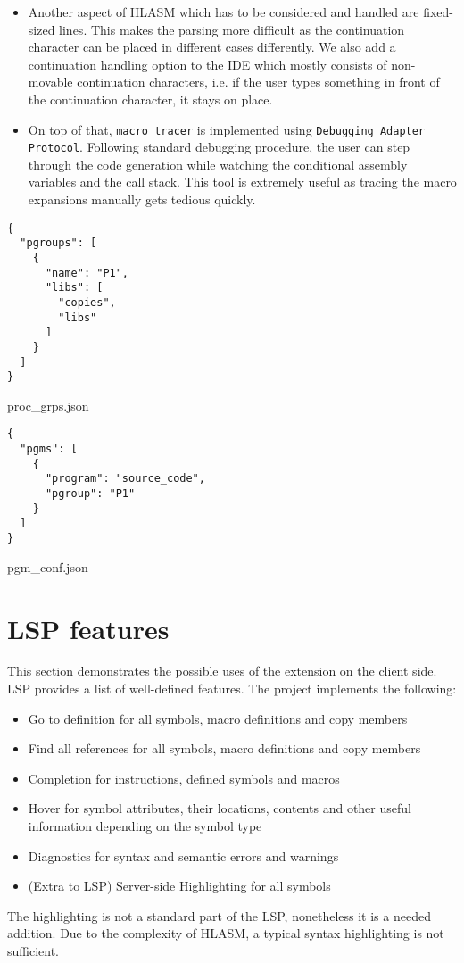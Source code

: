 \begin{itemize}
\item Another aspect of HLASM which has to be considered and handled are fixed-sized lines. This makes the parsing more difficult as the continuation character can be placed in different cases differently. We also add a continuation handling option to the IDE which mostly consists of non-movable continuation characters, i.e. if the user types something in front of the continuation character, it stays on place.

\item On top of that, \texttt{macro tracer} is implemented using \texttt{Debugging Adapter Protocol}. Following standard debugging procedure, the user can step through the code generation while watching the conditional assembly variables and the call stack. This tool is extremely useful as tracing the macro expansions manually gets tedious quickly.
\end{itemize}

\pagebreak
\begin{listing}
\begin{verbatim}
{
  "pgroups": [
    {
      "name": "P1",
      "libs": [
        "copies",
        "libs"
      ]
    }
  ]
}
\end{verbatim}
\caption{proc\_grps.json}
\label{lst:grps}
\end{listing}

\begin{listing}
\begin{verbatim}
{
  "pgms": [
    {
      "program": "source_code",
      "pgroup": "P1"
    }
  ]
}
\end{verbatim}
\caption{pgm\_conf.json}
\label{lst:pgm}
\end{listing}

\section{LSP features}
This section demonstrates the possible uses of the extension on the client side. LSP provides a list of well-defined features. The project implements the following:

\begin{itemize}
	\item Go to definition for all symbols, macro definitions and copy members
	\item Find all references for all symbols, macro definitions and copy members
	\item Completion for instructions, defined symbols and macros
	\item Hover for symbol attributes, their locations, contents and other useful information depending on the symbol type
	\item Diagnostics for syntax and semantic errors and warnings
	\item (Extra to LSP) Server-side Highlighting for all symbols  
\end{itemize}

The highlighting is not a standard part of the LSP, nonetheless it is a needed addition. Due to the complexity of HLASM, a typical syntax highlighting is not sufficient.
